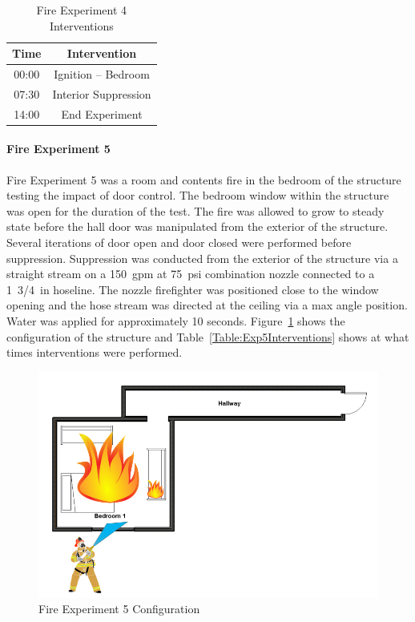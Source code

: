\documentclass[12pt,oneside]{book}
\begin{document}
\begin{table}[H]
	\centering
	\caption{Fire Experiment 4 Interventions}
	\begin{tabular}{|c|c|} 
		\hline
		Time & Intervention \\ \hline \hline
		00:00 & Ignition -- Bedroom \\ \hline
		07:30 & Interior Suppression \\ \hline
		14:00 & End Experiment\\ \hline
	\end{tabular}
	\label{Table:Exp4Interventions}
\end{table}

\clearpage

\paragraph{Fire Experiment 5} \mbox{}

Fire Experiment 5 was a room and contents fire in the bedroom of the structure testing the impact of door control. The bedroom window within the structure was open for the duration of the test. The fire was allowed to grow to steady state before the hall door was manipulated from the exterior of the structure. Several iterations of door open and door closed were performed before suppression. Suppression was conducted from the exterior of the structure via a straight stream on a 150~gpm at 75~psi combination nozzle connected to a 1~3/4~in hoseline. The nozzle firefighter was positioned close to the window opening and the hose stream was directed at the ceiling via a max angle position. Water was applied for approximately 10 seconds. Figure~\ref{fig:Exp5Config} shows the configuration of the structure and Table~\ref{Table:Exp5Interventions} shows at what times interventions were performed.


\begin{figure}[H]
	\centering
	\includegraphics[width=5in]{Howard_Exp_5.png}
	\caption{Fire Experiment 5 Configuration}
	\label{fig:Exp5Config}
\end{figure}
\end{document}
